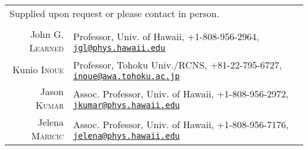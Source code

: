 \documentclass[a4paper,10pt]{article} %
\begin{document}
\begin{tabular}{rp{12cm}}
\multicolumn{2}{l}{\footnotesize{Supplied upon request or please contact in
person.}}\\
\multicolumn{2}{c}{}\\
John G. \textsc{Learned} & Professor, Univ. of Hawaii, +1-808-956-2964,
\href{mailto:jgl@phys.hawaii.edu}{\nolinkurl{jgl@phys.hawaii.edu}}\\

Kunio \textsc{Inoue} & Professor, Tohoku Univ./RCNS, +81-22-795-6727,
\href{mailto:inoue@awa.tohoku.ac.jp}{\nolinkurl{inoue@awa.tohoku.ac.jp}}\\

Jason \textsc{Kumar} & Assoc. Professor, Univ. of Hawaii, +1-808-956-2972,
\href{mailto:jkumar@phys.hawaii.edu}{\nolinkurl{jkumar@phys.hawaii.edu}}\\

Jelena \textsc{Maricic} & Assoc. Professor, Univ. of Hawaii, +1-808-956-7176,
\href{mailto:jelena@phys.hawaii.edu}{\nolinkurl{jelena@phys.hawaii.edu}}\\

\end{tabular}

\end{document}
